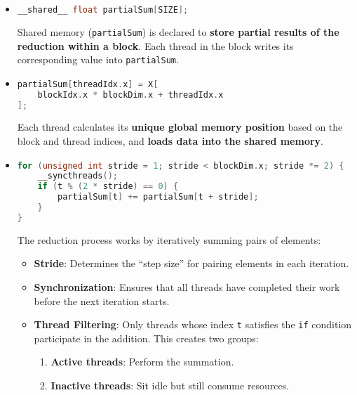 \begin{itemize}
    \item {}
    \begin{lstlisting}[language=c++]
__shared__ float partialSum[SIZE];\end{lstlisting}
    Shared memory (\texttt{partialSum}) is declared to \textbf{store partial results of the reduction within a block}. Each thread in the block writes its corresponding value into \texttt{partialSum}.

    \item {}
    \begin{lstlisting}[language=c++]
partialSum[threadIdx.x] = X[
    blockIdx.x * blockDim.x + threadIdx.x
];\end{lstlisting}
    Each thread calculates its \textbf{unique global memory position} based on the block and thread indices, and \textbf{loads data into the shared memory}.

    \item {}
    \begin{lstlisting}[language=c++]
for (unsigned int stride = 1; stride < blockDim.x; stride *= 2) {
    __syncthreads();
    if (t % (2 * stride) == 0) {
        partialSum[t] += partialSum[t + stride];
    }
}\end{lstlisting}
    The reduction process works by iteratively summing pairs of elements:
    \begin{itemize}
        \item \textbf{Stride}: Determines the ``step size'' for pairing elements in each iteration.
        \item \textbf{Synchronization}: Ensures that all threads have completed their work before the next iteration starts.
        \item \textbf{Thread Filtering}: Only threads whose index \texttt{t} satisfies the \texttt{if} condition participate in the addition. This creates two groups:
        \begin{enumerate}
            \item \textbf{Active threads}: Perform the summation.
            \item \textbf{Inactive threads}: Sit idle but still consume resources.
        \end{enumerate}
    \end{itemize}
\end{itemize}

